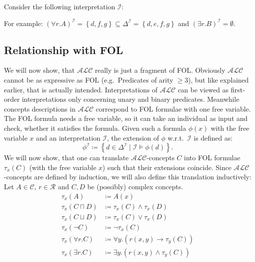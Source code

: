 \begin{example}
	Consider the following interpretation $\mathcal{I}$:
	\begin{figure}[H]
		\centering
	\end{figure}
	For example: $(\forall r.A)^\mathcal{I} = \left\{ d, f, g \right\} \subseteq \Delta^\mathcal{I} = \left\{ d,e,f,g \right\}$
	and $(\exists r.B)^\mathcal{I} = \emptyset$.
\end{example}

\subsection{Relationship with FOL}
We will now show, that $\mathcal{ALC}$ really is just a fragment of FOL.
Obviously $\mathcal{ALC}$ cannot be as expressive as FOL (e.g.\ Predicates of arity $ \geq 3$), but like explained earlier, that is actually intended.
\newline
Interpretations of $\mathcal{ALC}$ can be viewed as first-order interpretations only concerning unary and binary predicates.
Meanwhile concepts descriptions in $\mathcal{ALC}$ correspond to FOL formulae with one free variable. 
The FOL formula needs a free variable, so it can take an individual as input and check, whether it satisfies the formula.
\newline
Given such a formula $\phi (x)$ with the free variable $x$ and an interpretation $\mathcal{I}$, the extension of $\phi$ w.r.t.\ $\mathcal{I}$ is defined as:
\[
	\phi ^{\mathcal{I}} \coloneqq \left\{ d \in \Delta ^{\mathcal{I}} \mid \mathcal{I} \vDash \phi (d) \right\} 
.\]
We will now show, that one can translate $\mathcal{ALC}$-concepts $C$ into FOL formulae $\tau_{x}(C)$ (with the free variable $x$) such that their extensions coincide.
Since $\mathcal{ALC}$-concepts are defined by induction, we will also define this translation inductively:
Let $A \in \mathscr{C}$, $r \in \mathscr{R}$ and $C, D$ be (possibly) complex concepts.
\begin{align*}
	\tau_{x}(A) &\coloneqq A(x) \\
	\tau_{x} \left( C \sqcap D \right) &\coloneqq \tau_{x}(C) \land \tau_{x}(D) \\
	\tau_{x} \left( C \sqcup D \right) &\coloneqq \tau_{x}(C) \lor \tau_{x}(D) \\
	\tau_{x} (\neg C) &\coloneqq \neg \tau_{x}(C) \\
	\tau_{x} \left( \forall r.C \right) &\coloneqq \forall y.(r(x,y) \rightarrow \tau_{y}(C)) \\
	\tau_{x} \left( \exists r.C \right) &\coloneqq \exists y.(r(x,y) \land \tau_{y}(C)) \\
\end{align*}

